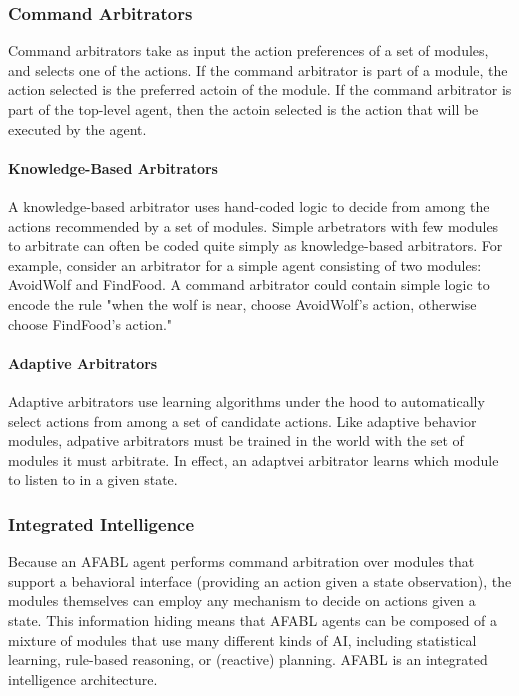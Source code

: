 \subsubsection{Command Arbitrators}

Command arbitrators take as input the action preferences of a set of
modules, and selects one of the actions.  If the command arbitrator is
part of a module, the action selected is the preferred actoin of the
module.  If the command arbitrator is part of the top-level agent,
then the actoin selected is the action that will be executed by the
agent.

\paragraph{Knowledge-Based Arbitrators}

A knowledge-based arbitrator uses hand-coded logic to decide from
among the actions recommended by a set of modules.  Simple arbetrators
with few modules to arbitrate can often be coded quite simply as
knowledge-based arbitrators.  For example, consider an arbitrator for
a simple agent consisting of two modules: AvoidWolf and FindFood.  A
command arbitrator could contain simple logic to encode the rule "when
the wolf is near, choose AvoidWolf's action, otherwise choose
FindFood's action."


\paragraph{Adaptive Arbitrators}

Adaptive arbitrators use learning algorithms under the hood to
automatically select actions from among a set of candidate actions.
Like adaptive behavior modules, adpative arbitrators must be trained
in the world with the set of modules it must arbitrate.  In effect, an
adaptvei arbitrator learns which module to listen to in a given state.


\subsubsection{Integrated Intelligence}

Because an AFABL agent performs command arbitration over modules that
support a behavioral interface (providing an action given a state
observation), the modules themselves can employ any mechanism to
decide on actions given a state.  This information hiding means that
AFABL agents can be composed of a mixture of modules that use many
different kinds of AI, including statistical learning, rule-based
reasoning, or (reactive) planning.  AFABL is an integrated
intelligence architecture.



